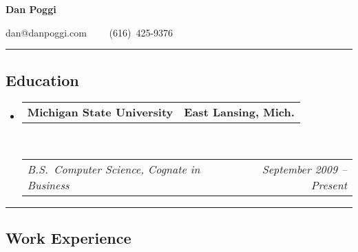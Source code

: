 \documentclass[12pt,letterpaper]{article}
\makeatletter
\newcommand{\floatcols}[2]
{\begin{tabular*}{\linewidth}{l@{\extracolsep{\fill}}r}
  #1 &
  #2 \\
\end{tabular*}}
\makeatother
\begin{document}
\begin{center}
{\LARGE \textbf{Dan Poggi}}

dan@danpoggi.com\ \ \textbullet
\ \ (616)~425-9376
\end{center}

\hrule
\vspace{-0.4em}
\subsection*{Education}

\begin{itemize}
  \parskip=0.1em

  \item 
    \floatcols
      {\textbf{Michigan State University}}
      {\textbf{East Lansing, Mich.}}
    \\
    \floatcols
      {\emph{B.S.~Computer Science, Cognate in Business}}
      {\emph{September 2009 -- Present}}
\end{itemize}


\hrule
\vspace{-0.4em}
\subsection*{Work Experience}
\end{document}
